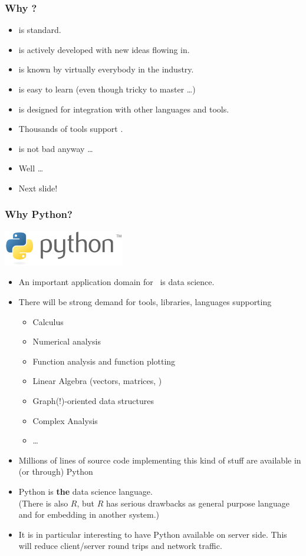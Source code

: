 \documentclass{beamer}
\begin{document}
\begin{frame}
\frametitle{Why ?}
\begin{itemize}
\item {} is standard.
\item {} is actively developed with new ideas flowing in.
\item {} is known by virtually everybody in the industry.
\item {} is easy to learn (even though tricky to master \dots)
\item {} is designed for integration with other languages and tools.
\item Thousands of tools support .
\item {} is not bad anyway \dots
\item Well \dots
\item Next slide!
\end{itemize}
\end{frame}

\begin{frame}[shrink]
\frametitle{Why Python?}
\includegraphics[width=0.3\linewidth]{pythonlogo.png}
\begin{itemize}
\item An important application domain for \nowdb\ is data science.
\item There will be strong demand for tools, libraries, languages supporting
\begin{itemize}
\item Calculus
\item Numerical analysis
\item Function analysis and function plotting
\item Linear Algebra (vectors, matrices, \etc)
\item Graph(!)-oriented data structures
\item Complex Analysis
\item \dots
\end{itemize}
\item Millions of lines of source code implementing this kind of stuff
      are available in (or through) Python
\item Python is \textbf{the} data science language.\\
      (There is also $R$, but $R$ has serious drawbacks
       as general purpose language and for embedding in another system.)
\item It is in particular interesting to have Python available
      on server side.
      This will reduce client/server round trips
      and network traffic.
\end{itemize}
\end{frame}
\end{document}
